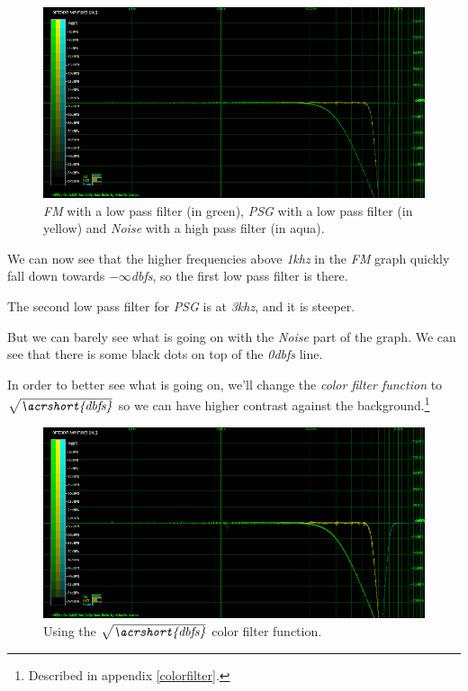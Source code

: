 \documentclass[10pt,a4paper]{report}
\newcommand{\ac}[1]{\textit{\acrshort{#1}}}
\newcommand{\khz}[1]{\textit{#1\acrshort{khz}}}
\newcommand{\db}[1]{\textit{#1\acrshort{dbfs}}}
\begin{document}
\begin{figure}[H]
	\centering
	\includegraphics[width=1.0\linewidth]{images/interpretation/Plot4-1-All.png}
	\caption[All Plotted]{\textit{FM} with a low pass filter (in green), \textit{PSG} with a low pass filter (in yellow) and \textit{Noise} with a high pass filter (in aqua).}
	\label{fig:plot4-1-all}
\end{figure}

We can now see that the higher frequencies above \khz{1} in the \textit{FM} graph quickly fall down towards \db{$-\infty$}, so the first low pass filter is there.

The second low pass filter for \textit{PSG} is at \khz{3}, and it is steeper.

But we can barely see what is going on with the \textit{Noise} part of the graph. We can see that there is some black dots on top of the \db{0} line.

In order to better see what is going on, we'll change the \textit{color filter function} to $\sqrt{\ac{dbfs}}$ so we can have higher contrast against the background.\footnote{Described in appendix \ref{colorfilter}.}

\begin{figure}[H]
	\centering
	\includegraphics[width=1.0\linewidth]{images/interpretation/Plot4-2-All-sqrt.png}
	\caption[Using SQRT]{Using the $\sqrt{\ac{dbfs}}$ color filter function.}
	\label{fig:plot4-2-all-sqrt}
\end{figure}
\end{document}
